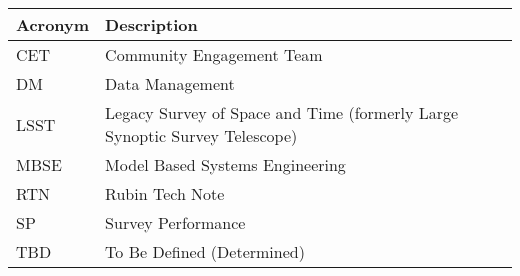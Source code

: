 \addtocounter{table}{-1}
\begin{longtable}{p{}p{}}\hline
\textbf{Acronym} & \textbf{Description}  \\\hline

CET & Community Engagement Team \\\hline
DM & Data Management \\\hline
LSST & Legacy Survey of Space and Time (formerly Large Synoptic Survey Telescope) \\\hline
MBSE & Model Based Systems Engineering \\\hline
RTN & Rubin Tech Note \\\hline
SP & Survey Performance \\\hline
TBD & To Be Defined (Determined) \\\hline
\end{longtable}
